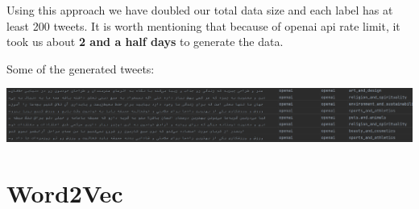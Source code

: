 \documentclass[12pt, letterpaper]{article}
\begin{document}
    Using this approach we have doubled our total data size and each label has at least 200 tweets. It is worth mentioning that because of openai api rate limit, it took us about \textbf{2 and a half days} to generate the data.

    Some of the generated tweets:
    \begin{center}
        \includegraphics[width=1\textwidth]{images/generated_tweets.png}
    \end{center}


    \section{Word2Vec}\label{sec:word2vec}
\end{document}
